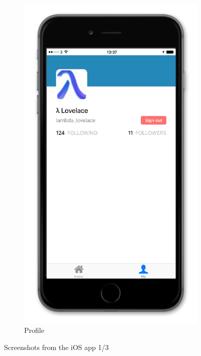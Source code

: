 \documentclass{article}
\begin{document}
\begin{figure}[H]
\begin{subfigure}[b]{0.48\textwidth}
        \includegraphics[width=\textwidth]{iphone_4_profile}
        \caption{Profile}
    \end{subfigure}
    
    \vspace{1em}
    
    \caption{Screenshots from the iOS app 1/3}
\end{figure}
\end{document}
